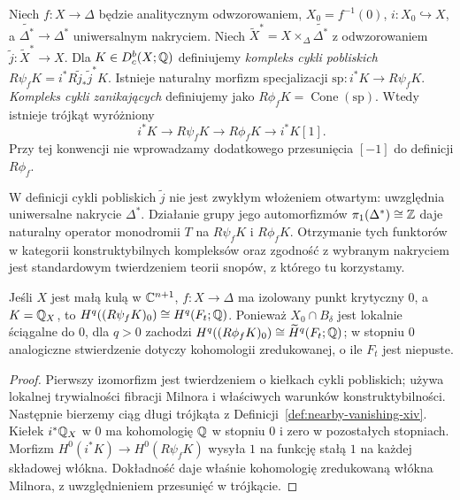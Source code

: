\begin{definicja}
\label{def:nearby-vanishing-xiv}
Niech $f:X\to\Delta$ będzie analitycznym odwzorowaniem,
$X_0=f^{-1}(0)$, $i:X_0\hookrightarrow X$, a
$\widetilde{\Delta^*}\to\Delta^*$ uniwersalnym nakryciem.
Niech $\widetilde X^*=X\times_\Delta\widetilde{\Delta^*}$
z odwzorowaniem $\widetilde j:\widetilde X^*\to X$.
Dla $K\in D_c^b(X;\mathbb{Q})$ definiujemy
\emph{kompleks cykli pobliskich}
$R\psi_f K=i^*R\widetilde j_*\widetilde j^*K$.
Istnieje naturalny morfizm specjalizacji
$\mathrm{sp}:i^*K\to R\psi_fK$.
\emph{Kompleks cykli zanikających} definiujemy jako
$R\phi_fK=\operatorname{Cone}(\mathrm{sp})$.
Wtedy istnieje trójkąt wyróżniony
\[
i^*K\longrightarrow R\psi_fK
\longrightarrow R\phi_fK\longrightarrow i^*K[1].
\]
Przy tej konwencji nie wprowadzamy dodatkowego
przesunięcia $[-1]$ do definicji $R\phi_f$.
\end{definicja}
\begin{uwaga}
W definicji cykli pobliskich $\widetilde j$
nie jest zwykłym włożeniem otwartym:
uwzględnia uniwersalne nakrycie $\Delta^*$.
Działanie grupy jego automorfizmów
$\pi_1(\Delta^*)\cong\mathbb{Z}$ daje naturalny
operator monodromii $T$ na $R\psi_fK$ i $R\phi_fK$.
Otrzymanie tych funktorów w kategorii
konstruktybilnych kompleksów oraz zgodność
z wybranym nakryciem jest standardowym twierdzeniem
teorii snopów, z którego tu korzystamy.
\end{uwaga}

\begin{stwierdzenie}
\label{prop:milnor-stalk-xiv}
Jeśli $X$ jest małą kulą w $\mathbb{C}^{n+1}$,
$f:X\to\Delta$ ma izolowany punkt krytyczny $0$,
a $K=\mathbb{Q}_X$, to
$H^q((R\psi_fK)_0)\cong H^q(F_t;\mathbb{Q})$.
Ponieważ $X_0\cap B_\delta$ jest lokalnie
ściągalne do $0$, dla $q>0$ zachodzi
$H^q((R\phi_fK)_0)\cong\widetilde H^q(F_t;\mathbb{Q})$;
w stopniu $0$ analogiczne stwierdzenie dotyczy
kohomologii zredukowanej, o ile $F_t$ jest niepuste.
\end{stwierdzenie}
\begin{proof}
Pierwszy izomorfizm jest twierdzeniem o kiełkach
cykli pobliskich; używa lokalnej trywialności
fibracji Milnora i właściwych warunków
konstruktybilności. Następnie bierzemy
ciąg długi trójkąta z
Definicji~\ref{def:nearby-vanishing-xiv}.
Kiełek $i^*\mathbb{Q}_X$ w $0$ ma kohomologię $\mathbb{Q}$
w stopniu $0$ i zero w pozostałych stopniach.
Morfizm $H^0(i^*K)\to H^0(R\psi_fK)$
wysyła $1$ na funkcję stałą $1$ na każdej
składowej włókna. Dokładność daje właśnie
kohomologię zredukowaną włókna Milnora,
z uwzględnieniem przesunięć w trójkącie.
\end{proof}

